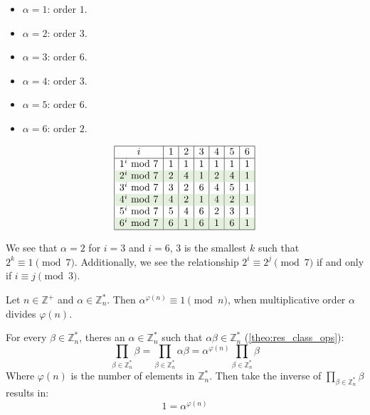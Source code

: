 \begin{minipage}{0.3\textwidth}
    \noindent
    \vspace{-1em}
    \begin{itemize}
        \item $\alpha=1$: order $1$.
        \item $\alpha=2$: order $3$.
        \item $\alpha=3$: order $6$.
        \item $\alpha=4$: order $3$.
        \item $\alpha=5$: order $6$.
        \item $\alpha=6$: order $2$.
    \end{itemize}
    \end{minipage}
\begin{minipage}{0.5\textwidth}
    \[
    \begin{array}{|c|c|c|c|c|c|c|}
    \hline
    i & 1 & 2 & 3 & 4 & 5 & 6 \\
    \hline
    1^i \text{ mod } 7 & 1 & 1 & 1 & 1 & 1 & 1 \\
    \rowcolor{OliveGreen!10}2^i \text{ mod } 7 & 2 & 4 & 1 & 2 & 4 & 1 \\
    3^i \text{ mod } 7 & 3 & 2 & 6 & 4 & 5 & 1 \\
    \rowcolor{OliveGreen!10}4^i \text{ mod } 7 & 4 & 2 & 1 & 4 & 2 & 1 \\
    5^i \text{ mod } 7 & 5 & 4 & 6 & 2 & 3 & 1 \\
    \rowcolor{OliveGreen!10}6^i \text{ mod } 7 & 6 & 1 & 6 & 1 & 6 & 1 \\
    \hline
    \end{array}
    \]
    \end{minipage}

    \vspace{1em}
    \noindent
    We see that $\alpha=2$ for $i=3$ and $i=6$, $3$ is the smallest $k$ such that $2^k\equiv 1\pmod{7}$.
    Additionally, we see the relationship $2^i\equiv 2^j\pmod{7}$ if and only if $i\equiv j\pmod{3}$.
 
    \begin{theo}
        
        Let $n\in\mathbb{Z^+}$ and $\alpha\in\mathbb{Z}_n^*$. Then $\alpha^{\varphi(n)}\equiv 1\pmod{n}$, when multiplicative order $\alpha$ divides $\varphi(n)$.
    \end{theo}
    \begin{Proof}
        For every $\beta\in\mathbb{Z}_n^*$, theres an $\alpha\in\mathbb{Z}_n^*$ such that $\alpha\beta\in\mathbb{Z}_n^*$ (\ref{theo:res_class_ops}):
        \[\prod_{\beta\in\mathbb{Z}_n^*}\beta=\prod_{\beta\in\mathbb{Z}_n^*}\alpha\beta=\alpha^{\varphi(n)}\prod_{\beta\in\mathbb{Z}_n^*}\beta\]
        Where $\varphi(n)$ is the number of elements in $\mathbb{Z}_n^*$. Then take the inverse of $\prod_{\beta\in\mathbb{Z}_n^*}\beta$ results in:
        \[1=\alpha^{\varphi(n)}\]
        

    \end{Proof}


